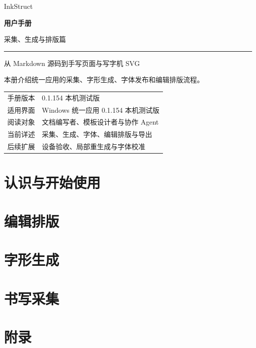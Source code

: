 \documentclass[UTF8,a4paper,zihao=-4,oneside,openany,fontset=fandol]{ctexbook}
\begin{document}
\begin{titlepage}
\thispagestyle{empty}
\vspace*{18mm}
{\sffamily\color{InkBlue}\fontsize{42}{48}\selectfont InkStruct\par}
\vspace{8mm}
{\Huge\bfseries 用户手册\par}
\vspace{5mm}
{\Large 采集、生成与排版篇\par}
\vspace{10mm}
\noindent\textcolor{InkBlue}{\rule{\textwidth}{1.2pt}}
\vspace{8mm}
{\large 从 Markdown 源码到手写页面与写字机 SVG\par}
\vspace{7mm}
\noindent 本册介绍统一应用的采集、字形生成、字体发布和编辑排版流程。\par
\vfill
\noindent\begin{tabular}{@{}ll@{}}
手册版本 & 0.1.154 本机测试版\\
适用界面 & Windows 统一应用 0.1.154 本机测试版\\
阅读对象 & 文档编写者、模板设计者与协作 Agent\\
当前详述 & 采集、生成、字体、编辑排版与导出\\
后续扩展 & 设备验收、局部重生成与字体校准\\
\end{tabular}
\vspace{14mm}
\end{titlepage}
\frontmatter

\tableofcontents
\mainmatter
\part{认识与开始使用}


\part{编辑排版}







\part{字形生成}

\part{书写采集}

\appendix
\part*{附录}


\end{document}
